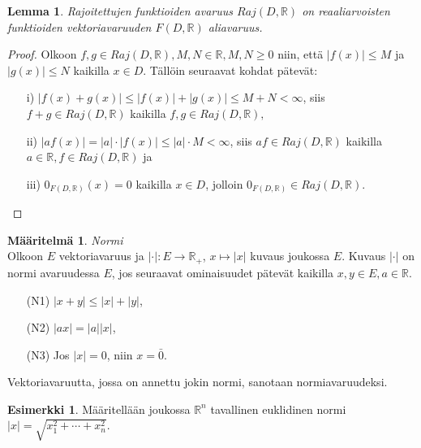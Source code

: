 \documentclass[12pt,a4paper,leqno]{report}
\newcommand{\R}{\mathbb{R}}
\theoremstyle{plain}
\newtheorem{lem}[equation]{Lemma}
\theoremstyle{definition}
\newtheorem{maar}[equation]{Määritelmä}
\newtheorem{esim}[equation]{Esimerkki}
\theoremstyle{remark}
\begin{document}
\begin{lem}
Rajoitettujen funktioiden avaruus $Raj(D,\R )$ on reaaliarvoisten funktioiden vektoriavaruuden $F(D,\R)$ aliavaruus.
\end{lem}
\begin{proof}
 Olkoon $f,g\in Raj(D,\R),M,N\in\R, M,N\geq 0$ niin, että $|f(x)|\leq M$ ja $|g(x)|\leq N$ kaikilla $x\in D$. Tällöin seuraavat kohdat pätevät: 
\begin{itemize}
\item[i)\phantom{iiv}] $|f(x)+g(x)|\leq|f(x)|+|g(x)|\leq M+N<\infty$, siis $f+g\in Raj(D,\R)$ kaikilla $f,g\in Raj(D,\R),$
\item[ii)\phantom{iv}] $|af(x)|= |a|\cdot|f(x)|\leq |a|\cdot M<\infty$, siis $af\in Raj(D,\R)$ kaikilla $a\in\R, f\in Raj(D,\R)$ ja
\item[iii)\phantom{v}] $0_{F(D,\R)}(x)=0$ kaikilla $x\in D$, jolloin $0_{F(D,\R)} \in Raj(D,\R )$.
\end{itemize}
\end{proof}

\begin{maar} \emph{Normi}\\
Olkoon $E$ vektoriavaruus ja $|\cdot|\colon E\rightarrow \R_+$, $x\mapsto|x|$ kuvaus joukossa $E$. %
Kuvaus $|\cdot|$ on normi avaruudessa $E$, jos seuraavat ominaisuudet pätevät kaikilla $ x,y\in E, a\in\R$.
\begin{itemize}
\item[(N1)]$|x+y|\leq |x|+|y|$,
\item[(N2)]$|ax|=|a||x|$,
\item[(N3)]Jos $|x|=0$, niin $x=\bar{0}$.
\end{itemize} 
Vektoriavaruutta, jossa on annettu jokin normi, sanotaan normiavaruudeksi.

\end{maar} 

\begin{esim}
Määritellään joukossa $\R ^n$ tavallinen euklidinen normi $|x| = \sqrt{x^{2}_{1} + \cdots +x^{2}_{n}}$.

\end{esim}
\end{document}

